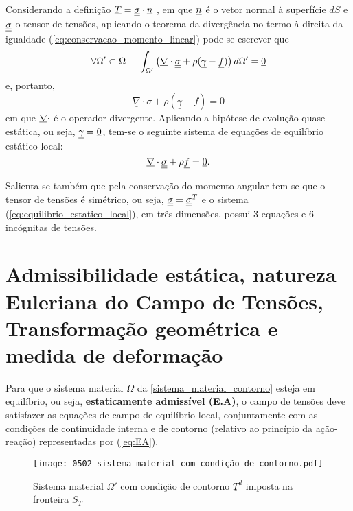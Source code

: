 Considerando a definição $\underline T = \underline{\underline \sigma} \cdot \underline n$ , em que $\underline n$ é o vetor normal à superfície $dS$ e $\underline{\underline \sigma}$ o tensor de tensões, aplicando o teorema da divergência no termo à direita da igualdade (\ref{eq:conservacao_momento_linear}) pode-se escrever que
\begin{equation}
	\label{teorema_divergencia}
	\forall \Omega' \subset \Omega ~~~~ \int_{\Omega'}\left( \underline \nabla \cdot \underline{\underline \sigma}+ \rho(\underline \gamma-\underline f) \right)d\Omega' = \underline 0
\end{equation}
e, portanto,
\begin{equation}
	\label{eq:resultado_teorema_divergencia}
	 \underline \nabla \cdot \underline{\underline\sigma}+ \rho(\underline\gamma-\underline f) = \underline 0
\end{equation}
em que $\underline \nabla \cdot$ é o operador divergente. Aplicando a hipótese de evolução quase estática, ou seja, $\underline \gamma = \underline 0$, tem-se o seguinte sistema de equações de equilíbrio estático local:
\begin{equation}
	\label{eq:equilibrio_estatico_local}
	\underline \nabla \cdot \underline{\underline \sigma}+ \rho \underline f = \underline 0.
\end{equation}

Salienta-se também que pela conservação do momento angular tem-se que o tensor de tensões é simétrico, ou seja, $\underline{\underline \sigma} = \underline{\underline \sigma}^T$ e o sistema (\ref{eq:equilibrio_estatico_local}), em três dimensões, possui 3 equações e 6 incógnitas de tensões.

\section{Admissibilidade estática, natureza Euleriana do Campo de Tensões, Transformação geométrica e medida de deformação}

Para que o sistema material $\Omega$ da \autoref{sistema_material_contorno} esteja em equilíbrio, ou seja, \textbf{estaticamente admissível (E.A)}, o campo de tensões deve satisfazer as equações de campo de equilíbrio local, conjuntamente com as condições de continuidade interna e de contorno (relativo ao princípio da ação-reação) representadas por (\ref{eq:EA}).

\begin{figure}[H]
	\begin{center}
		\texttt{[image: 0502-sistema material com condição de contorno.pdf]}
	\end{center}
	\caption{\label{sistema_material_contorno}Sistema material $\Omega'$ com condição de contorno $\underline T^d$ imposta na fronteira $S_T$}
\end{figure}

